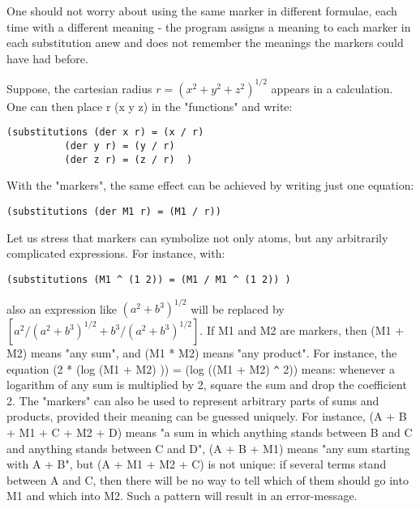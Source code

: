 \bigskip

\noindent One should not worry about using the same marker in  different
formulae, each time with a different meaning - the program assigns a meaning to
each marker in each  substitution
     anew  and  does  not remember the meanings the markers could
     have had before.

Suppose, the cartesian radius $r = (x^2 + y^2 + z^2)^{1/2}$ appears  in  a
calculation. One can then place r (x y z) in the "functions" and write:

\bigskip

\begin{verbatim}
(substitutions (der x r) = (x / r)
          (der y r) = (y / r)
          (der z r) = (z / r)  )
\end{verbatim}

\bigskip

\noindent With the "markers", the same effect can  be  achieved  by  writing
     just one equation:

\bigskip

\begin{verbatim}
(substitutions (der M1 r) = (M1 / r))
\end{verbatim}

\bigskip

Let us stress  that  markers  can  symbolize  not  only
     atoms,  but any arbitrarily complicated expressions. For instance, with:

\bigskip

\begin{verbatim}
(substitutions (M1 ^ (1 2)) = (M1 / M1 ^ (1 2)) )
\end{verbatim}

\bigskip

\noindent also an expression like $(a^2 + b^3)^{1/2}$ will  be  replaced by
$[a^2 / (a^2 + b^3)^{1/2} + b^3 / (a^2 + b^3)^{1/2}]$. If M1 and M2 are
     markers, then (M1 + M2) means "any sum", and (M1 * M2) means
     "any product". For instance, the equation  (2  *  (log (M1 +
     M2) )) =  (log ((M1 + M2) \verb+^+ 2)) means: whenever a logarithm
     of any sum is multiplied by 2, square the sum and  drop  the
coefficient  2.  The "markers" can also be used to represent arbitrary parts of
sums and products, provided their meaning can
     be guessed uniquely. For instance, (A + B + M1 + C + M2 + D)
     means "a sum in which anything stands between B  and  C  and
     anything  stands  between  C and D", (A + B + M1) means "any
     sum starting  with  A + B",  but  (A + M1 + M2 + C)  is  not
     unique:  if  several terms stand between A and C, then there
     will be no way to tell which of them should go into  M1  and
     which  into  M2.  Such  a  pattern  will result in an error-message.

